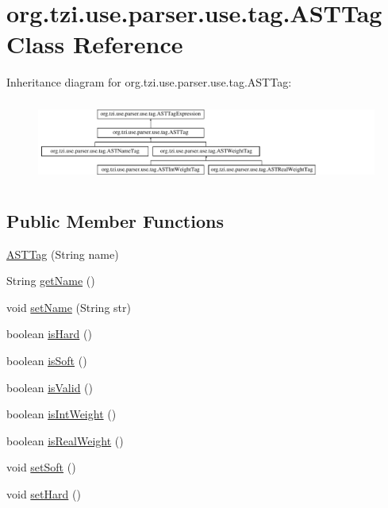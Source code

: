 \hypertarget{classorg_1_1tzi_1_1use_1_1parser_1_1use_1_1tag_1_1_a_s_t_tag}{\section{org.\-tzi.\-use.\-parser.\-use.\-tag.\-A\-S\-T\-Tag Class Reference}
\label{classorg_1_1tzi_1_1use_1_1parser_1_1use_1_1tag_1_1_a_s_t_tag}
}
Inheritance diagram for org.\-tzi.\-use.\-parser.\-use.\-tag.\-A\-S\-T\-Tag\-:\begin{figure}[H]
\begin{center}
\leavevmode
\includegraphics[height=2.695548cm]{classorg_1_1tzi_1_1use_1_1parser_1_1use_1_1tag_1_1_a_s_t_tag}
\end{center}
\end{figure}
\subsection*{Public Member Functions}
\begin{DoxyCompactItemize}
\item 
\hyperlink{classorg_1_1tzi_1_1use_1_1parser_1_1use_1_1tag_1_1_a_s_t_tag_ae1549520d8830b3417b61df16145170d}{A\-S\-T\-Tag} (String name)
\item 
String \hyperlink{classorg_1_1tzi_1_1use_1_1parser_1_1use_1_1tag_1_1_a_s_t_tag_adcb1c74835205159fdc0ebf802bede9b}{get\-Name} ()
\item 
void \hyperlink{classorg_1_1tzi_1_1use_1_1parser_1_1use_1_1tag_1_1_a_s_t_tag_a7461c527e5c6265294a837d083f358ab}{set\-Name} (String str)
\item 
boolean \hyperlink{classorg_1_1tzi_1_1use_1_1parser_1_1use_1_1tag_1_1_a_s_t_tag_af5b88626d828015c1758bd3a05fec168}{is\-Hard} ()
\item 
boolean \hyperlink{classorg_1_1tzi_1_1use_1_1parser_1_1use_1_1tag_1_1_a_s_t_tag_a8f78586e6aedc5be0c7a9ff5ce9f5d75}{is\-Soft} ()
\item 
boolean \hyperlink{classorg_1_1tzi_1_1use_1_1parser_1_1use_1_1tag_1_1_a_s_t_tag_a17e30c69002c70d2c5883ecaae7c1c1e}{is\-Valid} ()
\item 
boolean \hyperlink{classorg_1_1tzi_1_1use_1_1parser_1_1use_1_1tag_1_1_a_s_t_tag_a1b9aae03933a55546fdafbe769fa369f}{is\-Int\-Weight} ()
\item 
boolean \hyperlink{classorg_1_1tzi_1_1use_1_1parser_1_1use_1_1tag_1_1_a_s_t_tag_ac60d554aa870268e62be2ef5d4189ca8}{is\-Real\-Weight} ()
\item 
void \hyperlink{classorg_1_1tzi_1_1use_1_1parser_1_1use_1_1tag_1_1_a_s_t_tag_a2d0567bab40c63e521317bedea07d7a6}{set\-Soft} ()
\item 
void \hyperlink{classorg_1_1tzi_1_1use_1_1parser_1_1use_1_1tag_1_1_a_s_t_tag_ae10f1af15f6c6028816001226f759a55}{set\-Hard} ()
\end{DoxyCompactItemize}


